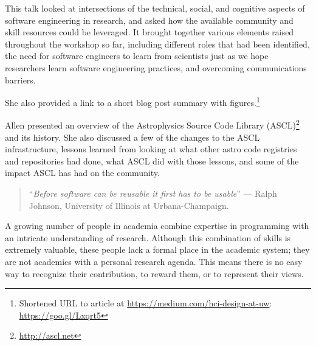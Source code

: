 \documentclass[a4paper,UKenglish]{dagrep}
\begin{document}
This talk looked at intersections of the technical, social, and cognitive aspects of software engineering in research, and asked how the available community and skill resources could be leveraged. It brought together various elements raised throughout the workshop so far, including different roles that had been identified, the need for software engineers to learn from scientists just as we hope researchers learn software engineering practices, and overcoming communications barriers. 

She also provided a link to a short blog post summary with figures.\footnote{Shortened URL to article at \url{https://medium.com/hci-design-at-uw}: \url{https://goo.gl/Lxqrt5}}



Allen presented an overview of the Astrophysics Source Code Library (ASCL)\footnote{\url{http://ascl.net}} and its history.
She also discussed a few of the changes to the ASCL infrastructure, lessons learned from looking at what other astro code registries and repositories had done, what ASCL did with those lessons, and some of the impact ASCL has had on the community.


\begin{quote}
``\textit{Before software can be reusable it first has to be usable}'' --- Ralph Johnson, University of Illinois at Urbana-Champaign.
\end{quote}

A growing number of people in academia combine expertise in programming with an intricate understanding of research. Although this combination of skills is extremely valuable, these people lack a formal place in the academic system; they are not academics with a personal research agenda. This means there is no easy way to recognize their contribution, to reward them, or to represent their views.
\end{document}
